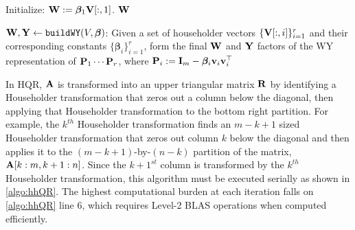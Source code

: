 \begin{algorithm2e}
	\DontPrintSemicolon %
	Initialize: $\mathbf{W}:=\bm{\beta}_1\mathbf{V}[:,1]$.
	\Return $\mathbf{W}$
	\caption{$\mathbf{W},\mathbf{Y}\gets {\tt buildWY}(V, \bm{\beta})$: Given a set of householder vectors $\{\mathbf{V}[:,i]\}_{i=1}^r$ and their corresponding constants $\{\bm{\beta}_i\}_{i=1}^r$, form the final $\mathbf{W}$ and $\mathbf{Y}$ factors of the WY representation of $\mathbf{P}_1\cdots \mathbf{P}_r$, where $\mathbf{P}_i := \mathbf{I}_m - \bm{\beta}_i\mathbf{v}_i\mathbf{v}_i^{\top}$}
	\label{algo:buildWY}
\end{algorithm2e}

In HQR, $\mathbf{A}$ is transformed into an upper triangular matrix $\mathbf{R}$ by identifying a Householder transformation that zeros out a column below the diagonal, then applying that Householder transformation to the bottom right partition. 
For example, the $k^{th}$ Householder transformation finds an $m-k+1$ sized Householder transformation that zeros out column $k$ below the diagonal and then applies it to the $(m-k+1)$-by-$(n-k)$ partition of the matrix, $\mathbf{A}[k:m,k+1:n]$.
Since the $k+1^{st}$ column is transformed by the $k^{th}$ Householder transformation, this algorithm must be executed serially as shown in \cref{algo:hhQR}.
The highest computational burden at each iteration falls on \cref{algo:hhQR} line 6, which requires Level-2 BLAS operations when computed efficiently. \par

